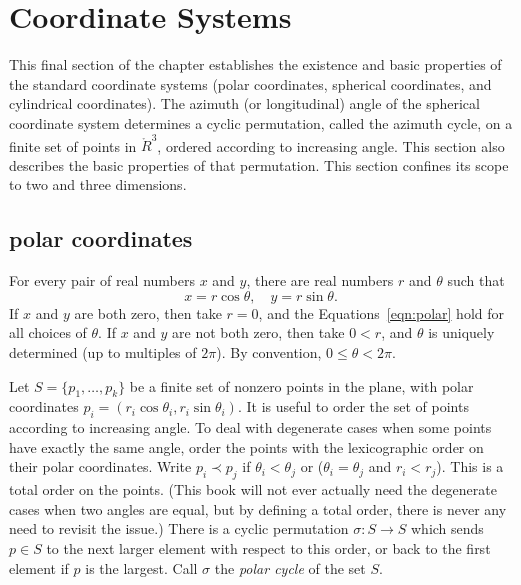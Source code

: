 

\section{Coordinate Systems}

This final section of the chapter establishes the existence
and basic properties of the standard coordinate systems
(polar coordinates, spherical coordinates, and cylindrical
coordinates).  The azimuth (or longitudinal) angle of the
spherical coordinate system determines a cyclic permutation,
called the azimuth cycle,
on a finite set of points in $\ring{R}^3$, ordered according
to increasing angle.  This section also describes the basic
properties of that permutation.  This section confines its
scope to two and three dimensions.

\subsection{polar coordinates}
\label{sec:polar}


For every pair of real numbers $x$ and $y$,  there are real numbers
$r$ and $\theta$ such that
    \begin{equation}\label{eqn:polar}
    x = r\cos\theta,\quad y = r\sin\theta.
    \end{equation}
If $x$ and $y$ are both zero, then take $r=0$, and the
Equations~\ref{eqn:polar} hold for all choices of $\theta$. If $x$
and $y$ are not both zero, then take $0<r$, and $\theta$ is
uniquely determined (up to multiples of $2\pi$).  By convention, 
$0\le\theta < 2\pi$.

Let $S=\{p_1,\ldots,p_k\}$ be a finite set of
nonzero points in the plane, with
polar coordinates $p_i = (r_i\cos\theta_i,r_i\sin\theta_i)$.
It is useful to order the set of points according to increasing angle.
To deal with degenerate cases when some points have exactly
the same angle, order the points with the lexicographic order on their
polar coordinates.  Write $p_i \prec p_j$ if
$\theta_i < \theta_j$ or ($\theta_i=\theta_j$ and $r_i<r_j$).
This is a total order on the points.  (This book will not ever
actually need the degenerate cases when two angles are equal,
but by defining a total order,  there is never any need to revisit the issue.)
There is a cyclic permutation $\sigma:S\to S$ which sends
$p\in S$ to the next larger element with respect to this order,
or back to the first element if $p$ is the largest.
Call $\sigma$ the {\it polar cycle}
of the set $S$.




